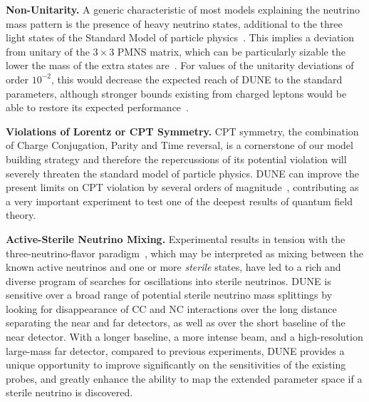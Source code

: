 {\bf Non-Unitarity.} 
A generic characteristic of most models explaining the neutrino mass
pattern is the presence of heavy neutrino states, additional to the
three light states of the Standard Model of particle
physics~\cite{Minkowski:1977sc,Mohapatra:1979ia,Yanagida:1979as,GellMann:1980vs}. This implies a deviation from unitary of the $3\times3$ PMNS matrix, which can be particularly sizable the lower the mass of the extra states are~\cite{Mohapatra:1986bd,Akhmedov:1995vm,Akhmedov:1995ip,Malinsky:2005bi}.
For values of the unitarity deviations of order $10^{-2}$, this would decrease the expected reach of DUNE to the standard parameters, although stronger bounds existing from charged leptons would be able to restore its expected performance~\cite{Blennow:2016jkn,Escrihuela:2016ube}.

{\bf Violations of Lorentz or CPT Symmetry.}
CPT symmetry, the combination of Charge Conjugation, Parity and Time reversal, is a cornerstone of our model building strategy and therefore the repercussions of its potential violation will severely threaten the standard model of particle physics. DUNE can improve the present limits on CPT violation by several orders of magnitude~\cite{Streater:1989vi,Barenboim:2002tz,Barenboim:2017ewj}, contributing
as a very important experiment to test one of the deepest results of quantum field theory.

{\bf Active-Sterile Neutrino Mixing.}
Experimental results in tension with the three-neutrino-flavor paradigm~\cite{Aguilar:2001ty,Aguilar-Arevalo:2013pmq,Acero:2007su,Mention:2011rk}, which may be interpreted as mixing between the known active neutrinos and one or more {\it sterile} states, have led to a rich and diverse program of searches for oscillations into sterile neutrinos.
DUNE is sensitive over a broad range of potential sterile neutrino mass splittings by looking for disappearance of CC and NC interactions over the long distance separating the near and far detectors, as well as over the short baseline of the near detector. 
With a longer baseline, a more intense beam, and a high-resolution large-mass far detector, compared to previous experiments, DUNE provides a unique opportunity to improve significantly on the sensitivities of the existing probes, and greatly enhance the ability to map the extended parameter space if a sterile neutrino is discovered.

